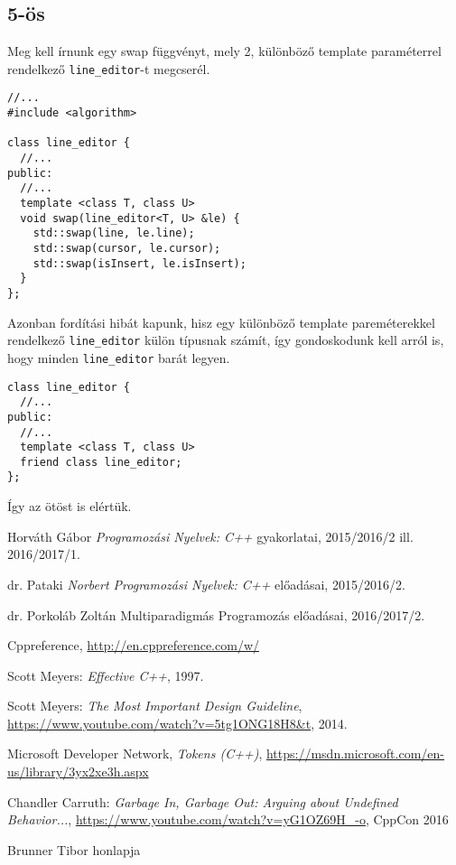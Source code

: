 \documentclass[../cpp_book/cpp_book.tex]{subfiles}
\begin{document}
	\subsection{5-ös}
	Meg kell írnunk egy swap függvényt, mely 2, különböző template paraméterrel rendelkező \texttt{line\_editor}-t megcserél.
	\begin{lstlisting}
//...
#include <algorithm>

class line_editor {
  //...
public:
  //...
  template <class T, class U>
  void swap(line_editor<T, U> &le) {
    std::swap(line, le.line);
    std::swap(cursor, le.cursor);
    std::swap(isInsert, le.isInsert);
  }
};
	\end{lstlisting}
	Azonban fordítási hibát kapunk, hisz egy különböző template pareméterekkel rendelkező \texttt{line\_editor} külön típusnak számít, így gondoskodunk kell arról is, hogy minden \texttt{line\_editor} barát legyen.
	\begin{lstlisting}
class line_editor {
  //...
public:
  //...
  template <class T, class U>
  friend class line_editor;
};
	\end{lstlisting}
	Így az ötöst is elértük.
	\begin{thebibliography}{1}
		
		 Horváth Gábor \textit{Programozási Nyelvek: C++} gyakorlatai, 2015/2016/2 ill. 2016/2017/1.
		
		 dr. Pataki \textit{Norbert Programozási Nyelvek: C++} előadásai, 2015/2016/2.
		
		 dr. Porkoláb Zoltán Multiparadigmás Programozás előadásai, 2016/2017/2.
		
		 Cppreference, \url{http://en.cppreference.com/w/}
		
		 Scott Meyers: \textit{Effective C++}, 1997.
		
		 Scott Meyers: \textit{The Most Important Design Guideline}, \url{https://www.youtube.com/watch?v=5tg1ONG18H8&t}, 2014.
		
		  Microsoft Developer Network, \textit{Tokens (C++)}, \url{https://msdn.microsoft.com/en-us/library/3yx2xe3h.aspx}
		
		 Chandler Carruth: \textit{Garbage In, Garbage Out: Arguing about Undefined Behavior...}, \url{https://www.youtube.com/watch?v=yG1OZ69H_-o}, CppCon 2016
		
		 Brunner Tibor honlapja
		
	\end{thebibliography}
\end{document}

